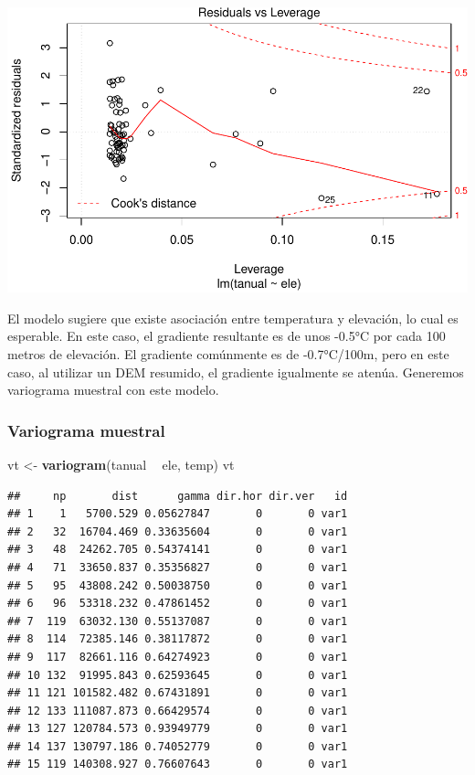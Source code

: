 \documentclass[11pt,]{article}
\newenvironment{Shaded}{\begin{snugshade}}{\end{snugshade}}
\newcommand{\KeywordTok}[1]{\textcolor[rgb]{0.13,0.29,0.53}{\textbf{#1}}}
\newcommand{\StringTok}[1]{\textcolor[rgb]{0.31,0.60,0.02}{#1}}
\newcommand{\OperatorTok}[1]{\textcolor[rgb]{0.81,0.36,0.00}{\textbf{#1}}}
\newcommand{\NormalTok}[1]{#1}
\begin{document}
\includegraphics[width=600px]{Proyecto-Precipitaciones_files/figure-latex/agregar-y-modelo-5}

El modelo sugiere que existe asociación entre temperatura y elevación,
lo cual es esperable. En este caso, el gradiente resultante es de unos
-0.5°C por cada 100 metros de elevación. El gradiente comúnmente es de
-0.7°C/100m, pero en este caso, al utilizar un DEM resumido, el
gradiente igualmente se atenúa. Generemos variograma muestral con este
modelo.

\subsubsection{Variograma muestral}\label{variograma-muestral-1}

\begin{Shaded}
\begin{Highlighting}[]
\NormalTok{vt <-}\StringTok{ }\KeywordTok{variogram}\NormalTok{(tanual }\OperatorTok{~}\StringTok{ }\NormalTok{ele, temp)}
\NormalTok{vt}
\end{Highlighting}
\end{Shaded}

\begin{verbatim}
##     np       dist      gamma dir.hor dir.ver   id
## 1    1   5700.529 0.05627847       0       0 var1
## 2   32  16704.469 0.33635604       0       0 var1
## 3   48  24262.705 0.54374141       0       0 var1
## 4   71  33650.837 0.35356827       0       0 var1
## 5   95  43808.242 0.50038750       0       0 var1
## 6   96  53318.232 0.47861452       0       0 var1
## 7  119  63032.130 0.55137087       0       0 var1
## 8  114  72385.146 0.38117872       0       0 var1
## 9  117  82661.116 0.64274923       0       0 var1
## 10 132  91995.843 0.62593645       0       0 var1
## 11 121 101582.482 0.67431891       0       0 var1
## 12 133 111087.873 0.66429574       0       0 var1
## 13 127 120784.573 0.93949779       0       0 var1
## 14 137 130797.186 0.74052779       0       0 var1
## 15 119 140308.927 0.76607643       0       0 var1
\end{verbatim}
\end{document}
